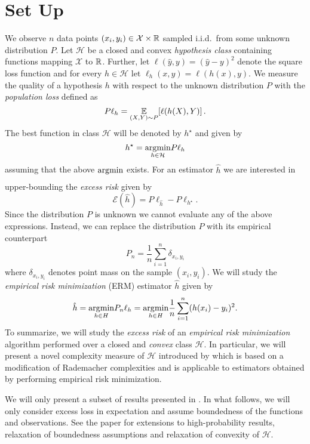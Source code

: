 \documentclass[main.tex]{subfiles}
\begin{document}
\section{Set Up}
\label{section:set-up}

We observe $n$ data points $(x_{i}, y_{i}) \in \mathcal{X} \times \mathbb{R}$
sampled i.i.d.\ from some unknown distribution $P$.
Let $\mathcal{H}$ be a closed and convex \emph{hypothesis class} containing
functions mapping $\mathcal{X}$ to $\mathbb{R}$. Further, let $\ell(\hat{y}, y) =
(\hat{y} - y)^{2}$ denote the square loss function and for every
$h \in \mathcal{H}$ let $\ell_{h}(x,y) = \ell(h(x), y)$.
We measure the quality of a hypothesis $h$ with respect to the unknown
distribution $P$ with the \emph{population loss} defined as
$$
  P\ell_{h} = \underset{{(X,Y) \sim P}}{\mathbb{E}}\!\left[{\ell(h(X), Y)}\right].
$$
The best function in class $\mathcal{H}$ will be denoted by
$h^{\star}$ and given by
$$
  h^{\star} = \underset{h \in \mathcal{H}}{\operatorname{arg}\!\operatorname{min}}{P\ell_{h}}
$$
assuming that the above $\underset{}{\operatorname{arg}\!\operatorname{min}}{}$ exists.
For an estimator $\hat{h}$ we are interested in upper-bounding the
\emph{excess risk} given by
$$
  \mathcal{E}(\hat{h}) = P\ell_{\hat{h}} - P\ell_{h^{\star}}.
$$
Since the distribution $P$ is unknown we cannot evaluate any of the above
expressions. Instead, we can replace the distribution $P$ with its empirical
counterpart
$$
  P_{n} = \frac{1}{n} \sum_{i=1}^{n} \delta_{x_{i}, y_{i}}
$$
where $\delta_{x_{i}, y_{i}}$ denotes point mass on the sample $(x_{i},
y_{i})$.
We will study the \emph{empirical risk minimization} (ERM) estimator
$\hat{h}$ given by
$$
  \hat{h}
  = \underset{h \in H}{\operatorname{arg}\!\operatorname{min}}{P_{n}\ell_{h}}
  = \underset{h \in H}{\operatorname{arg}\!\operatorname{min}}{\frac{1}{n} \sum_{i=1}^{n} (h(x_{i}) - y_{i})^{2}}.
$$
To summarize, we will study the \emph{excess risk} of an \emph{empirical risk
  minimization}
algorithm performed over a closed and \emph{convex} class $\mathcal{H}$.
In particular, we will present a novel complexity measure of $\mathcal{H}$
introduced by \citet{liang2015learning} which is based on a modification of
Rademacher complexities and is applicable to estimators obtained by performing
empirical risk minimization.

\begin{remark}
  We will only present a subset of results presented in \citet{liang2015learning}.
  In what follows, we will only consider excess loss in expectation and
  assume boundedness of the functions and observations.
  See the paper for extensions to high-probability results, relaxation of
  boundedness assumptions and relaxation of convexity of $\mathcal{H}$.
\end{remark}
\end{document}

